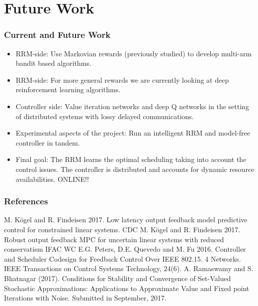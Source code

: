 \documentclass{beamer}
\begin{document}
\section{Future Work}
\begin{frame}
 \frametitle{Current and Future Work}
 \begin{itemize}
  \item RRM-side: Use Markovian rewards (previously studied) to develop multi-arm bandit based
	algorithms.
  \item RRM-side: For more general rewards we are currently looking at deep 
  reinforcement learning algorithms.
  \item Controller side: Value iteration networks and deep Q networks in the setting of distributed 
  systems with lossy delayed communications.
  \item Experimental aspects of the project: Run an intelligent RRM and model-free controller in tandem.
  \item Final goal: The RRM learns the optimal scheduling taking into account the control issues. 
  The controller is distributed and
  accounts for dynamic resource availabilities. {\color{purple} ONLINE!!}
  \end{itemize}
\end{frame}
\begin{frame}
\frametitle{References}
\footnotesize{
\begin{thebibliography}{99} %
 M. K\"{o}gel and R. Findeisen 2017. Low latency output feedback model predictive control for
constrained linear systems. CDC
 M. K\"{o}gel and R. Findeisen 2017. Robust output feedback MPC for uncertain linear systems with
reduced conservatism  IFAC WC
 E.G. Peters, D.E. Quevedo and M. Fu 2016. Controller and Scheduler Codesign for 
 Feedback Control Over IEEE 802.15. 4 Networks. IEEE Transactions on Control Systems Technology, 24(6).
  A. Ramaswamy and S. Bhatnagar (2017).
 Conditions for Stability and Convergence of
Set-Valued Stochastic Approximations: Applications to Approximate Value and Fixed
point Iterations with Noise. Submitted in September, 2017.
 \end{thebibliography}
}
\end{frame}
\end{document}
